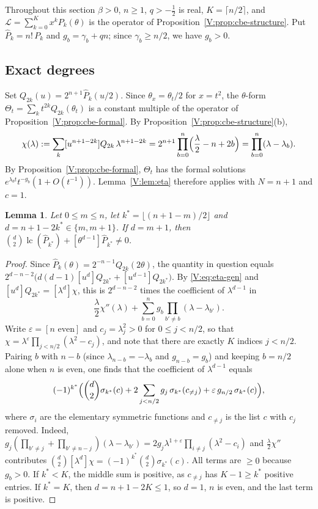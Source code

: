 \documentclass[11pt,a4paper]{article}
\newtheorem{lemma}[theorem]{Lemma}
\theoremstyle{definition}
\theoremstyle{remark}
\newcommand{\fl}[1]{\lfloor #1\rfloor}
\newcommand{\cl}[1]{\lceil #1\rceil}
\DeclareMathOperator{\lc}{lc}
\numberwithin{equation}{section}
\begin{document}
Throughout this section $\beta>0$, $n\ge1$, $q>-\frac12$ is real, $K=\cl{n/2}$, and $\mathcal L=\sum_{k=0}^{K}x^kP_k(\theta)$ is the operator of Proposition~\ref{V:prop:cbe-structure}. Put $\hat P_k=n!\,P_k$ and $g_b=\gamma_b+qn$; since $\gamma_b\ge n/2$, we have $g_b>0$.

\subsection{Exact degrees}
Set $Q_{2k}(u)=2^{n+1}\hat P_k(u/2)$. Since $\theta_x=\theta_t/2$ for $x=t^2$, the $\theta$-form $\Theta_t=\sum_kt^{2k}Q_{2k}(\theta_t)$ is a constant multiple of the operator of Proposition~\ref{V:prop:cbe-formal}. By Proposition~\ref{V:prop:cbe-structure}(b),
\[
\chi(\lambda):=\sum_k[u^{n+1-2k}]Q_{2k}\,\lambda^{n+1-2k}=2^{n+1}\prod_{b=0}^{n}\Bigl(\frac\lambda2-n+2b\Bigr)=\prod_{b=0}^{n}(\lambda-\lambda_b).
\]
By Proposition~\ref{V:prop:cbe-formal}, $\Theta_t$ has the formal solutions $e^{\lambda_bt}t^{-g_b}(1+O(t^{-1}))$. Lemma~\ref{V:lem:eta} therefore applies with $N=n+1$ and $c=1$.

\begin{lemma}\label{V:lem:exact-degree}
Let $0\le m\le n$, let $k^*=\fl{(n+1-m)/2}$ and $d=n+1-2k^*\in\{m,m+1\}$. If $d=m+1$, then $\binom{d}{2}\lc(\hat P_{k^*})+[\theta^{d-1}]\hat P_{k^*}\ne0$.
\end{lemma}

\begin{proof}
Since $\hat P_k(\theta)=2^{-n-1}Q_{2k}(2\theta)$, the quantity in question equals $2^{d-n-2}\bigl(d(d-1)[u^d]Q_{2k^*}+[u^{d-1}]Q_{2k^*}\bigr)$. By \eqref{V:eq:eta-gen} and $[u^d]Q_{2k^*}=[\lambda^d]\chi$, this is $2^{d-n-2}$ times the coefficient of $\lambda^{d-1}$ in
\[
\frac\lambda2\chi''(\lambda)+\sum_{b=0}^{n}g_b\prod_{b'\ne b}(\lambda-\lambda_{b'}).
\]
Write $\varepsilon=[n\text{ even}]$ and $c_j=\lambda_j^2>0$ for $0\le j<n/2$, so that $\chi=\lambda^\varepsilon\prod_{j<n/2}(\lambda^2-c_j)$, and note that there are exactly $K$ indices $j<n/2$. Pairing $b$ with $n-b$ (since $\lambda_{n-b}=-\lambda_b$ and $g_{n-b}=g_b$) and keeping $b=n/2$ alone when $n$ is even, one finds that the coefficient of $\lambda^{d-1}$ equals
\[
(-1)^{k^*}\Bigl(\binom d2\sigma_{k^*}(c)+2\sum_{j<n/2}g_j\,\sigma_{k^*}(c_{\ne j})+\varepsilon\,g_{n/2}\,\sigma_{k^*}(c)\Bigr),
\]
where $\sigma_i$ are the elementary symmetric functions and $c_{\ne j}$ is the list $c$ with $c_j$ removed. Indeed, $g_j(\prod_{b'\ne j}+\prod_{b'\ne n-j})(\lambda-\lambda_{b'})=2g_j\lambda^{1+\varepsilon}\prod_{i\ne j}(\lambda^2-c_i)$ and $\frac\lambda2\chi''$ contributes $\binom d2[\lambda^d]\chi=(-1)^{k^*}\binom d2\sigma_{k^*}(c)$. All terms are $\ge0$ because $g_b>0$. If $k^*<K$, the middle sum is positive, as $c_{\ne j}$ has $K-1\ge k^*$ positive entries. If $k^*=K$, then $d=n+1-2K\le1$, so $d=1$, $n$ is even, and the last term is positive.
\end{proof}
\end{document}

